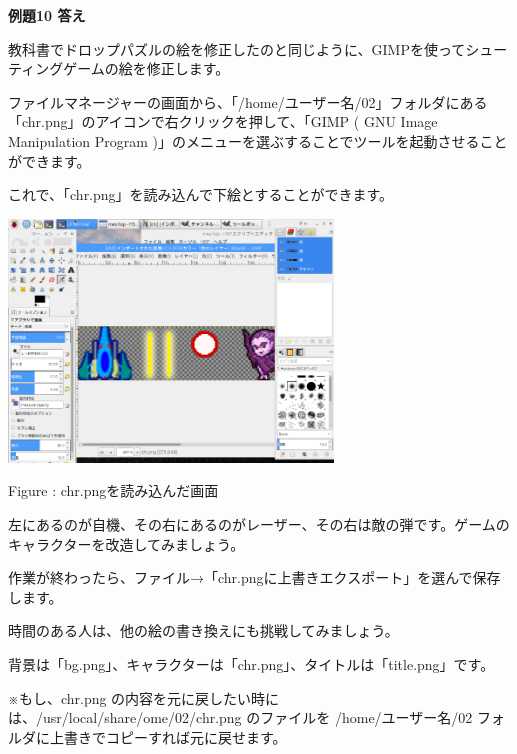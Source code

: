 \documentclass[a4paper,12pt]{jarticle}
\newcounter{Figure}
\renewcommand\theFigure{\arabic{Figure}}
\begin{document}
\bigskip

\bigskip

{\bfseries
例題10 答え}


\bigskip

教科書でドロップパズルの絵を修正したのと同じように、GIMPを使ってシューティングゲームの絵を修正します。


\bigskip

ファイルマネージャーの画面から、「/home/ユーザー名/02」フォルダにある「chr.png」のアイコンで右クリックを押して、「GIMP ( GNU Image Manipulation Program )」のメニューを選ぶすることでツールを起動させることができます。

これで、「chr.png」を読み込んで下絵とすることができます。

\bigskip
\bigskip

\begin{minipage}{9.781cm}
\centering
{\upshape
\includegraphics[keepaspectratio,width=8.625cm,height=6.459cm]{text02-img/text02-img042.png}
\flushleft

Figure \stepcounter{Figure}{\theFigure}: chr.pngを読み込んだ画面}
\end{minipage}

\bigskip
\bigskip
\bigskip

左にあるのが自機、その右にあるのがレーザー、その右は敵の弾です。ゲームのキャラクターを改造してみましょう。

作業が終わったら、ファイル→「chr.pngに上書きエクスポート」を選んで保存します。


\bigskip

時間のある人は、他の絵の書き換えにも挑戦してみましょう。

背景は「bg.png」、キャラクターは「chr.png」、タイトルは「title.png」です。

\bigskip

※もし、chr.png の内容を元に戻したい時には、/usr/local/share/ome/02/chr.png のファイルを /home/ユーザー名/02 フォルダに上書きでコピーすれば元に戻せます。
\end{document}
